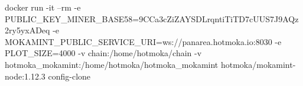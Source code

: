 \begin{shellcommandbox}\begin{ttlst}
docker run -it --rm -e PUBLIC_KEY_MINER_BASE58=9CCa3cZiZAYSDLrqntiTiTD7cUUS7J9AQz2ry5yxADeq -e MOKAMINT_PUBLIC_SERVICE_URI=ws://panarea.hotmoka.io:8030 -e PLOT_SIZE=4000 -v chain:/home/hotmoka/chain -v hotmoka_mokamint:/home/hotmoka/hotmoka_mokamint hotmoka/mokamint-node:1.12.3 config-clone
\end{ttlst}\end{shellcommandbox}
